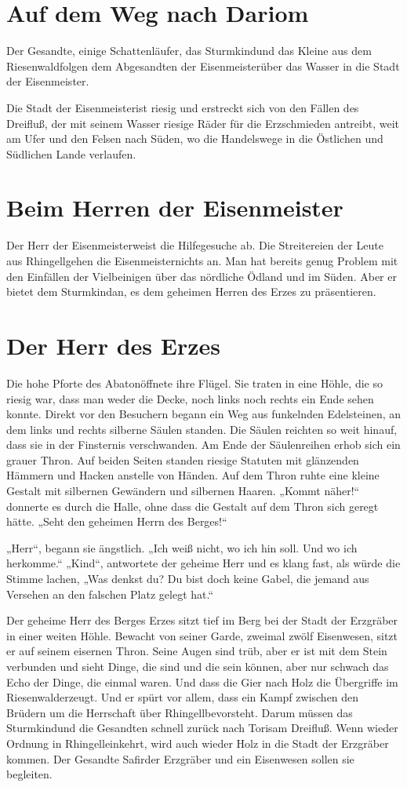 \documentclass[12pt,a4paper,onecolumn,twoside,ngerman]{book}
\newcommand{\Sturmkind}{Sturmkind}
\newcommand{\Schattenjager}{Schattenläufer}
\newcommand{\Rhingell}{Rhingell}
\newcommand{\Dreifluss}{Dreifluß}
\newcommand{\Toris}{Toris}
\newcommand{\Riesenwald}{Riesenwald}
\newcommand{\Eisenmeister}{Eisenmeister}
\newcommand{\Dariom}{Dariom}
\newcommand{\Abaton}{Abaton}
\newcommand{\Safir}{Safir}
\begin{document}
\section{Auf dem Weg nach \Dariom}
Der Gesandte, einige \Schattenjager, das \Sturmkind und das Kleine aus dem \Riesenwald folgen dem Abgesandten der \Eisenmeister über das Wasser in die Stadt der \Eisenmeister.

Die Stadt der \Eisenmeister ist riesig und erstreckt sich von den Fällen des \Dreifluss, der mit seinem Wasser riesige Räder für die Erzschmieden antreibt, weit am Ufer und den Felsen nach Süden, wo die Handelswege in die Östlichen und Südlichen Lande verlaufen.

\section{Beim Herren der \Eisenmeister}
Der Herr der \Eisenmeister weist die Hilfegesuche ab. Die Streitereien der Leute aus \Rhingell gehen die \Eisenmeister nichts an. Man hat bereits genug Problem mit den Einfällen der Vielbeinigen über das nördliche Ödland und im Süden. Aber er bietet dem \Sturmkind an, es dem geheimen Herren des Erzes zu präsentieren.

\section{Der Herr des Erzes}
Die hohe Pforte des \Abaton öffnete ihre Flügel. Sie traten in eine Höhle, die so riesig war, dass man weder die Decke, noch links noch rechts ein Ende sehen konnte. Direkt vor den Besuchern begann ein Weg aus funkelnden Edelsteinen, an dem links und rechts silberne Säulen standen. Die Säulen reichten so weit hinauf, dass sie in der Finsternis verschwanden.
Am Ende der Säulenreihen erhob sich ein grauer Thron. Auf beiden Seiten standen riesige Statuten mit glänzenden Hämmern und Hacken anstelle von Händen. Auf dem Thron ruhte eine kleine Gestalt mit silbernen Gewändern und silbernen Haaren. „Kommt näher!“ donnerte es durch die Halle, ohne dass die Gestalt auf dem Thron sich geregt hätte. „Seht den geheimen Herrn des Berges!“ 

„Herr“, begann sie ängstlich. „Ich weiß nicht, wo ich hin soll. Und wo ich herkomme.“
„Kind“, antwortete der geheime Herr und es klang fast, als würde die Stimme lachen, „Was denkst du? Du bist doch keine Gabel, die jemand aus Versehen an den falschen Platz gelegt hat.“

Der geheime Herr des Berges Erzes sitzt tief im Berg bei der Stadt der Erzgräber in einer weiten Höhle. Bewacht von seiner Garde, zweimal zwölf Eisenwesen, sitzt er auf seinem eisernen Thron. Seine Augen sind trüb, aber er ist mit dem Stein verbunden und sieht Dinge, die sind und die sein können, aber nur schwach das Echo der Dinge, die einmal waren. Und dass die Gier nach Holz die Übergriffe im \Riesenwald erzeugt. Und er spürt vor allem, dass ein Kampf zwischen den Brüdern um die Herrschaft über \Rhingell bevorsteht. Darum müssen das \Sturmkind und die Gesandten schnell zurück nach \Toris am \Dreifluss. Wenn wieder Ordnung in \Rhingell einkehrt, wird auch wieder Holz in die Stadt der Erzgräber kommen. Der Gesandte \Safir der Erzgräber und ein Eisenwesen sollen sie begleiten.
\end{document}
